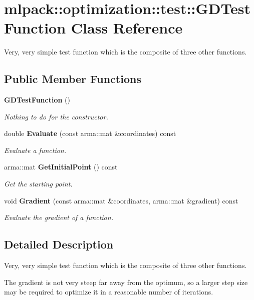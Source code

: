 \section{mlpack\+:\+:optimization\+:\+:test\+:\+:G\+D\+Test\+Function Class Reference}
\label{classmlpack_1_1optimization_1_1test_1_1GDTestFunction}


Very, very simple test function which is the composite of three other functions.  


\subsection*{Public Member Functions}
\begin{DoxyCompactItemize}
\item 
{\bf G\+D\+Test\+Function} ()
\begin{DoxyCompactList}\small\item\em Nothing to do for the constructor. \end{DoxyCompactList}\item 
double {\bf Evaluate} (const arma\+::mat \&coordinates) const 
\begin{DoxyCompactList}\small\item\em Evaluate a function. \end{DoxyCompactList}\item 
arma\+::mat {\bf Get\+Initial\+Point} () const 
\begin{DoxyCompactList}\small\item\em Get the starting point. \end{DoxyCompactList}\item 
void {\bf Gradient} (const arma\+::mat \&coordinates, arma\+::mat \&gradient) const 
\begin{DoxyCompactList}\small\item\em Evaluate the gradient of a function. \end{DoxyCompactList}\end{DoxyCompactItemize}


\subsection{Detailed Description}
Very, very simple test function which is the composite of three other functions. 

The gradient is not very steep far away from the optimum, so a larger step size may be required to optimize it in a reasonable number of iterations. 

